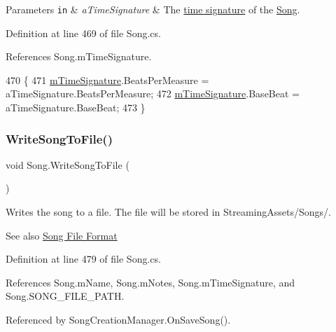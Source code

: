\begin{DoxyParams}[1]{Parameters}
\mbox{\tt in}  & {\em a\+Time\+Signature} & The \hyperlink{group___music_structs_struct_music_1_1_time_signature}{time signature} of the \hyperlink{class_song}{Song}. \\
\hline
\end{DoxyParams}


Definition at line 469 of file Song.\+cs.



References Song.\+m\+Time\+Signature.


\begin{DoxyCode}
470     \{
471         \hyperlink{group___song_priv_var_ga2b2dcc0e83e49f7303b6a1371877b25e}{mTimeSignature}.BeatsPerMeasure = aTimeSignature.BeatsPerMeasure;
472         \hyperlink{group___song_priv_var_ga2b2dcc0e83e49f7303b6a1371877b25e}{mTimeSignature}.BaseBeat = aTimeSignature.BaseBeat;
473     \}
\end{DoxyCode}
\mbox{\label{group___song_pub_func_ga70b0f6021c3b0590c561a88e3d1e5c2f}} 
\subsubsection{\texorpdfstring{Write\+Song\+To\+File()}{WriteSongToFile()}}
{\footnotesize\ttfamily void Song.\+Write\+Song\+To\+File (\begin{DoxyParamCaption}{ }\end{DoxyParamCaption})}



Writes the song to a file. The file will be stored in Streaming\+Assets/\+Songs/. 

\begin{DoxySeeAlso}{See also}
\hyperlink{group___song_group_DocSongFileFormat}{Song File Format} 
\end{DoxySeeAlso}


Definition at line 479 of file Song.\+cs.



References Song.\+m\+Name, Song.\+m\+Notes, Song.\+m\+Time\+Signature, and Song.\+S\+O\+N\+G\+\_\+\+F\+I\+L\+E\+\_\+\+P\+A\+TH.



Referenced by Song\+Creation\+Manager.\+On\+Save\+Song().


